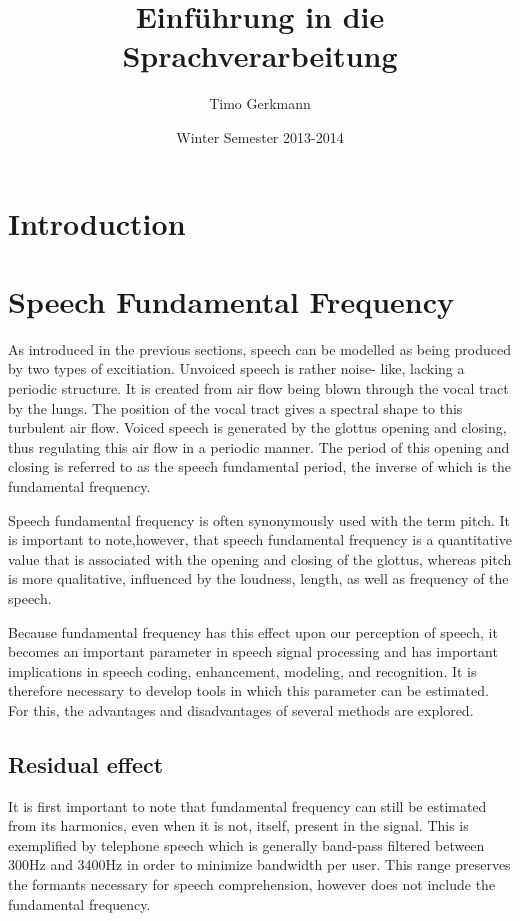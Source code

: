 \documentclass{article}
\begin{document}
\title{Einführung in die Sprachverarbeitung}
\author{Timo Gerkmann}
\date{Winter Semester 2013-2014} %
\maketitle

\section{Introduction}

\section{Speech Fundamental Frequency}

As introduced in the previous sections, speech can be modelled as being produced by two types of excitiation. Unvoiced speech is rather noise- like, lacking a periodic structure.  It is created from air flow being blown through the vocal tract by the lungs. The position of the vocal tract gives a spectral shape to this turbulent air flow.  Voiced speech is generated by the glottus opening and closing, thus regulating this air flow in a periodic manner.  The period of this opening and closing is referred to as the speech fundamental period, the inverse of which is the fundamental frequency.

Speech fundamental frequency is often synonymously used with the term pitch.  It is important to note,however, that speech fundamental frequency is a quantitative value that is associated with the opening and closing of the glottus, whereas pitch is more qualitative, influenced by the loudness, length, as well as frequency of the speech.

Because fundamental frequency has this effect upon our perception of speech, it becomes an important parameter in speech signal processing and has important implications in speech coding, enhancement, modeling, and recognition.  It is therefore necessary to develop tools in which this parameter can be estimated.  For this, the advantages and disadvantages of several methods are explored.

\subsection{Residual effect}

	It is first important to note that fundamental frequency can still be estimated from its harmonics, even when it is not, itself, present in the signal.  This is exemplified by telephone speech which is generally band-pass filtered between 300Hz and 3400Hz in order to minimize bandwidth per user.  This range preserves the formants necessary for speech comprehension, however does not include the fundamental frequency.  
	
\end{document}
